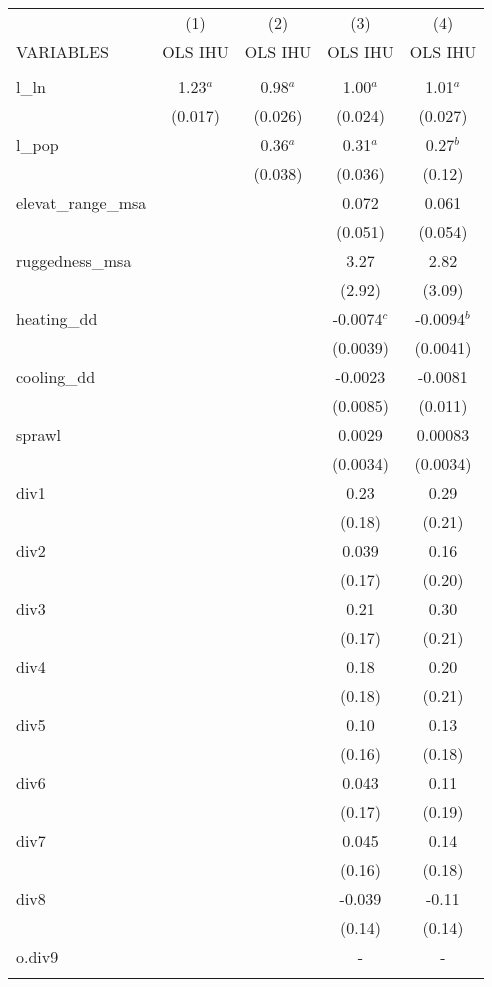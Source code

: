 \documentclass[]{article}
\begin{document}
\begin{tabular}{lcccc} \hline
 & (1) & (2) & (3) & (4) \\
VARIABLES & OLS IHU & OLS IHU & OLS IHU & OLS IHU \\ \hline
 &  &  &  &  \\
l\_ln & 1.23$^a$ & 0.98$^a$ & 1.00$^a$ & 1.01$^a$ \\
 & (0.017) & (0.026) & (0.024) & (0.027) \\
l\_pop &  & 0.36$^a$ & 0.31$^a$ & 0.27$^b$ \\
 &  & (0.038) & (0.036) & (0.12) \\
elevat\_range\_msa &  &  & 0.072 & 0.061 \\
 &  &  & (0.051) & (0.054) \\
ruggedness\_msa &  &  & 3.27 & 2.82 \\
 &  &  & (2.92) & (3.09) \\
heating\_dd &  &  & -0.0074$^c$ & -0.0094$^b$ \\
 &  &  & (0.0039) & (0.0041) \\
cooling\_dd &  &  & -0.0023 & -0.0081 \\
 &  &  & (0.0085) & (0.011) \\
sprawl &  &  & 0.0029 & 0.00083 \\
 &  &  & (0.0034) & (0.0034) \\
div1 &  &  & 0.23 & 0.29 \\
 &  &  & (0.18) & (0.21) \\
div2 &  &  & 0.039 & 0.16 \\
 &  &  & (0.17) & (0.20) \\
div3 &  &  & 0.21 & 0.30 \\
 &  &  & (0.17) & (0.21) \\
div4 &  &  & 0.18 & 0.20 \\
 &  &  & (0.18) & (0.21) \\
div5 &  &  & 0.10 & 0.13 \\
 &  &  & (0.16) & (0.18) \\
div6 &  &  & 0.043 & 0.11 \\
 &  &  & (0.17) & (0.19) \\
div7 &  &  & 0.045 & 0.14 \\
 &  &  & (0.16) & (0.18) \\
div8 &  &  & -0.039 & -0.11 \\
 &  &  & (0.14) & (0.14) \\
o.div9 &  &  & - & - \\
 &  &  &  &  \\

\end{tabular}
\end{document}
